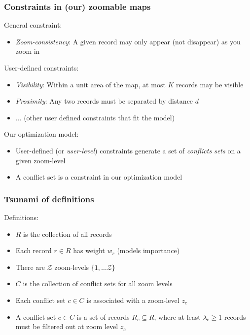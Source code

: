 \documentclass{beamer}
\begin{document}
\frame
{
  \frametitle{Constraints in (our) zoomable maps}
  General constraint:
  \begin{itemize}
  \item \emph{Zoom-consistency}: A given record may only appear (not disappear) as you zoom in 
  \end{itemize}
  
  User-defined constraints:
  \begin{itemize}
  \item \emph{Visibility}: Within a unit area of the map, at most $K$ records may be visible
  \item \emph{Proximity}: Any two records must be separated by distance $d$
  \item ... (other user defined constraints that fit the model)
  \end{itemize}
  Our optimization model:
  \begin{itemize}
  \item User-defined (or \emph{user-level}) constraints generate a set of \emph{conflicts sets} on a given zoom-level
  \item A conflict set is a constraint in our optimization model
  \end{itemize}
}




\frame
{
  \frametitle{Tsunami of definitions}
  Definitions:
  \begin{itemize}
  \item $R$ is the collection of all records
  \item Each record $r \in R$ has weight $w_r$ (models importance)
  \item There are $\mathcal{Z}$ zoom-levels $\lbrace 1, \dots \mathcal{Z} \rbrace$
  \item $C$ is the collection of conflict sets for all zoom levels
  \item Each conflict set $c \in C$ is associated with a zoom-level $z_c$
  \item A conflict set $c \in C$ is a set of records $R_c \subseteq R$, where at least $\lambda_c \geq 1$ records must be filtered out at zoom level $z_c$  
  \end{itemize}
}
\end{document}

